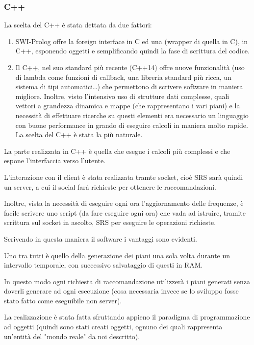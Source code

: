 {\subsubsection{C++}
La scelta del C++ è stata dettata da due fattori:
\begin{enumerate}
    \item SWI-Prolog offre la foreign interface in C ed una (wrapper di quella in C), in C++, esponendo oggetti e semplificando quindi la fase di scrittura del codice.
    \item Il C++, nel suo standard più recente (C++14) offre nuove funzionalità (uso di lambda come funzioni di callback, una libreria standard più ricca, un sistema di tipi automatici\dots) che permettono di scrivere software in maniera migliore. Inoltre, visto l'intensivo uso di strutture dati complesse, quali vettori a grandezza dinamica e mappe (che rappresentano i vari piani) e la necessità di effettuare ricerche su questi elementi era necessario un linguaggio con buone performance in grando di eseguire calcoli in maniera molto rapide. La scelta del C++ è stata la più naturale.
\end{enumerate}

La parte realizzata in C++ è quella che esegue i calcoli più complessi e che espone l'interfaccia verso l'utente.

L'interazione con il client è stata realizzata tramte socket, cioè SRS sarà quindi un server, a cui il social farà richieste per ottenere le raccomandazioni.

Inoltre, vista la necessità di eseguire ogni ora l'aggiornamento delle frequenze, è facile scrivere uno script (da fare eseguire ogni ora) che vada ad istruire, tramite scrittura sul socket in ascolto, SRS per eseguire le operazioni richieste.

Scrivendo in questa maniera il software i vantaggi sono evidenti.

Uno tra tutti è quello della generazione dei piani una sola volta durante un intervallo temporale, con successivo salvataggio di questi in RAM.

In questo modo ogni richiesta di raccomandazione utilizzerà i piani generati senza doverli generare ad ogni esecuzione (cosa necessaria invece se lo sviluppo fosse stato fatto come eseguibile non server).

La realizzazione è stata fatta sfruttando appieno il paradigma di programmazione ad oggetti (quindi sono stati creati oggetti, ognuno dei quali rappresenta un'entità del "mondo reale" da noi descritto).

}
